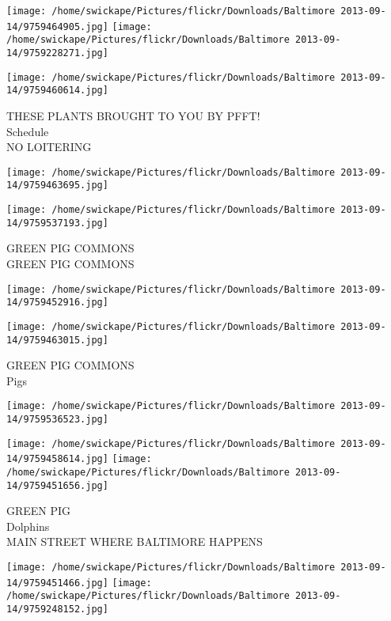 \documentclass[10pt,letterpaper]{article}
\begin{document}
\texttt{[image: /home/swickape/Pictures/flickr/Downloads/Baltimore 2013-09-14/9759464905.jpg]}
\texttt{[image: /home/swickape/Pictures/flickr/Downloads/Baltimore 2013-09-14/9759228271.jpg]}

\vspace{0.25in}
\texttt{[image: /home/swickape/Pictures/flickr/Downloads/Baltimore 2013-09-14/9759460614.jpg]}

THESE PLANTS BROUGHT TO YOU BY PFFT!\\
Schedule\\
NO LOITERING\\
\pagebreak

\texttt{[image: /home/swickape/Pictures/flickr/Downloads/Baltimore 2013-09-14/9759463695.jpg]}

\vspace{0.25in}
\texttt{[image: /home/swickape/Pictures/flickr/Downloads/Baltimore 2013-09-14/9759537193.jpg]}

GREEN PIG COMMONS\\
GREEN PIG COMMONS\\
\pagebreak

\texttt{[image: /home/swickape/Pictures/flickr/Downloads/Baltimore 2013-09-14/9759452916.jpg]}

\vspace{0.25in}
\texttt{[image: /home/swickape/Pictures/flickr/Downloads/Baltimore 2013-09-14/9759463015.jpg]}

GREEN PIG COMMONS\\
Pigs\\
\pagebreak

\texttt{[image: /home/swickape/Pictures/flickr/Downloads/Baltimore 2013-09-14/9759536523.jpg]}

\vspace{0.25in}
\texttt{[image: /home/swickape/Pictures/flickr/Downloads/Baltimore 2013-09-14/9759458614.jpg]}
\texttt{[image: /home/swickape/Pictures/flickr/Downloads/Baltimore 2013-09-14/9759451656.jpg]}

GREEN PIG\\
Dolphins\\
MAIN STREET WHERE BALTIMORE HAPPENS\\
\pagebreak

\texttt{[image: /home/swickape/Pictures/flickr/Downloads/Baltimore 2013-09-14/9759451466.jpg]}
\texttt{[image: /home/swickape/Pictures/flickr/Downloads/Baltimore 2013-09-14/9759248152.jpg]}
\end{document}
